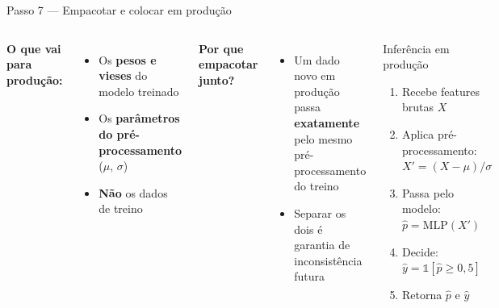 \documentclass[aspectratio=169]{beamer}
\begin{document}
\begin{frame}{Passo 7 — Empacotar e colocar em produção}
\begin{columns}
\textbf{O que vai para produção:}
\begin{itemize}
  \item Os \textbf{pesos e vieses} do modelo treinado
  \item Os \textbf{parâmetros do pré-processamento} ($\mu$, $\sigma$)
  \item \textbf{Não} os dados de treino
\end{itemize}
\vspace{6pt}
\textbf{Por que empacotar junto?}
\begin{itemize}
  \item Um dado novo em produção passa \textbf{exatamente} pelo mesmo pré-processamento do treino
  \item Separar os dois é garantia de inconsistência futura
\end{itemize}
\begin{block}{Inferência em produção}
  \begin{enumerate}
    \item Recebe features brutas $X$
    \item Aplica pré-processamento: $X' = (X - \mu)/\sigma$
    \item Passa pelo modelo: $\hat{p} = \text{MLP}(X')$
    \item Decide: $\hat{y} = \mathbb{1}[\hat{p} \geq 0{,}5]$
    \item Retorna $\hat{p}$ e $\hat{y}$
  \end{enumerate}
\end{block}
\end{columns}
\end{frame}
\end{document}
